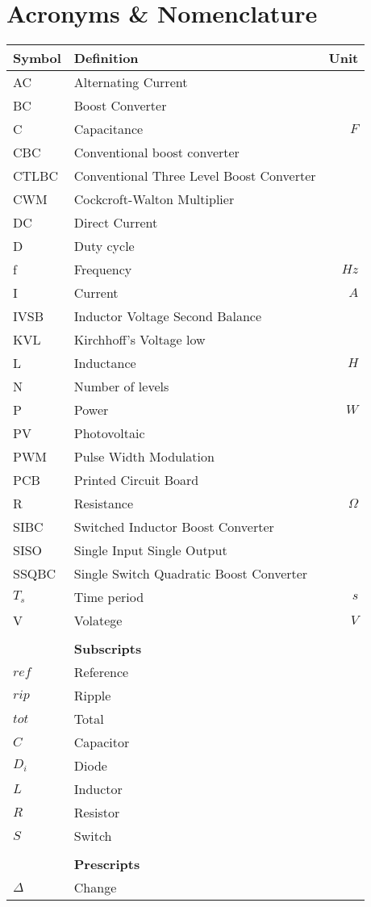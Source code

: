 \chapter*{Acronyms \& Nomenclature}
\begin{tabular*}{\textwidth}{@{\extracolsep{\fill}} l l r}
	\textbf{Symbol}	& \textbf{Definition}			& \textbf{Unit}\\
	\hline
	AC			& Alternating Current				& \\
	BC			& Boost Converter					& \\
	C			& Capacitance						& $F$\\
	CBC			& Conventional boost converter					& \\
	CTLBC		&Conventional Three Level Boost Converter		& \\
	CWM		    & Cockcroft-Walton Multiplier 		& \\
	DC			& Direct Current					& \\
	D			& Duty cycle					& \\
	f			& Frequency					& $Hz$\\
	I			& Current							& $A$\\
	IVSB		& Inductor Voltage Second Balance				& \\
	KVL			& Kirchhoff's Voltage low				& \\
	L			& Inductance					& $H$\\
	N			& Number of levels						& \\
	P			& Power								& $W$\\
	PV			& Photovoltaic						& \\
	PWM			& Pulse Width Modulation						& \\
	PCB			& Printed Circuit Board					& \\
	R			& Resistance						& $\Omega$\\
	SIBC			&Switched Inductor Boost Converter			& \\
	SISO		& Single Input Single Output		& \\
	SSQBC			&Single Switch Quadratic Boost Converter	& \\
	$T_s$		& Time period					&$s$ \\
	V			& Volatege							& $V$\\
	\hline \hline
				& 									&	\\
				& \textbf{Subscripts}				&	\\
	\hline
	$ref$		& Reference							&	\\
	$rip$		& Ripple							&	\\
	$tot$		& Total								&	\\
	
	$C$			& Capacitor							&	\\
	$D_i$		& Diode							&	\\
	$L$			& Inductor							&	\\
	$R$			& Resistor							&	\\
	$S$			& Switch							&	\\
	\hline \hline
				& 									&	\\
				& \textbf{Prescripts}				&	\\
	\hline
	$\Delta$	& Change							&	\\
	\hline \hline
\end{tabular*}